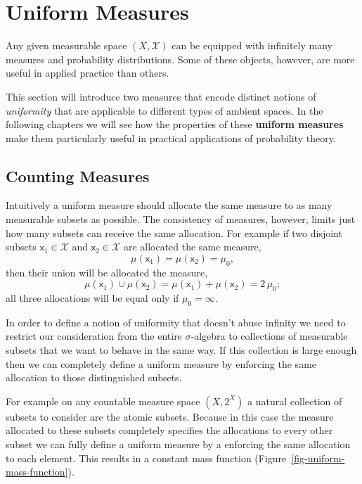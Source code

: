 \documentclass[
  letterpaper,
  DIV=11,
  numbers=noendperiod]{scrartcl}
\begin{document}
\hypertarget{uniform-measures}{%
\section{Uniform Measures}\label{uniform-measures}}

Any given measurable space \((X, \mathcal{X})\) can be equipped with
infinitely many measures and probability distributions. Some of these
objects, however, are more useful in applied practice than others.

This section will introduce two measures that encode distinct notions of
\emph{uniformity} that are applicable to different types of ambient
spaces. In the following chapters we will see how the properties of
these \textbf{uniform measures} make them particularly useful in
practical applications of probability theory.

\hypertarget{counting-measures}{%
\subsection{Counting Measures}\label{counting-measures}}

Intuitively a uniform measure should allocate the same measure to as
many measurable subsets as possible. The consistency of measures,
however, limits just how many subsets can receive the same allocation.
For example if two disjoint subsets \(\mathsf{x}_{1} \in \mathcal{X}\)
and \(\mathsf{x}_{2} \in \mathcal{X}\) are allocated the same measure,
\[
\mu(\mathsf{x}_{1}) = \mu(\mathsf{x}_{2}) = \mu_{0},
\] then their union will be allocated the measure, \[
\mu(\mathsf{x}_{1}) \cup \mu(\mathsf{x}_{2})
=
\mu(\mathsf{x}_{1}) + \mu(\mathsf{x}_{2})
=
2 \, \mu_{0};
\] all three allocations will be equal only if \(\mu_{0} = \infty\).

In order to define a notion of uniformity that doesn't abuse infinity we
need to restrict our consideration from the entire \(\sigma\)-algebra to
collections of measurable subsets that we want to behave in the same
way. If this collection is large enough then we can completely define a
uniform measure by enforcing the same allocation to those distinguished
subsets.

For example on any countable measure space \((X, 2^{X})\) a natural
collection of subsets to consider are the atomic subsets. Because in
this case the measure allocated to these subsets completely specifies
the allocations to every other subset we can fully define a uniform
measure by a enforcing the same allocation to each element. This results
in a constant mass function (Figure~\ref{fig-uniform-mass-function}).
\end{document}
